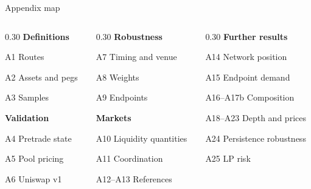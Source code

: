 
\begin{frame}{Appendix map}
\footnotesize
\begin{columns}[T,totalwidth=0.96\textwidth]
\begin{column}{0.30\textwidth}
\textbf{Definitions}
\par\vspace{0.10cm}
A1 Routes\par
A2 Assets and pegs\par
A3 Samples\par
\vspace{0.24cm}
\textbf{Validation}
\par\vspace{0.10cm}
A4 Pretrade state\par
A5 Pool pricing\par
A6 Uniswap v1\par
\end{column}
\begin{column}{0.30\textwidth}
\textbf{Robustness}
\par\vspace{0.10cm}
A7 Timing and venue\par
A8 Weights\par
A9 Endpoints\par
\vspace{0.24cm}
\textbf{Markets}
\par\vspace{0.10cm}
A10 Liquidity quantities\par
A11 Coordination\par
A12--A13 References\par
\end{column}
\begin{column}{0.30\textwidth}
\textbf{Further results}
\par\vspace{0.10cm}
A14 Network position\par
A15 Endpoint demand\par
A16--A17b Composition\par
A18--A23 Depth and prices\par
A24 Persistence robustness\par
A25 LP risk\par
\end{column}
\end{columns}
\end{frame}


